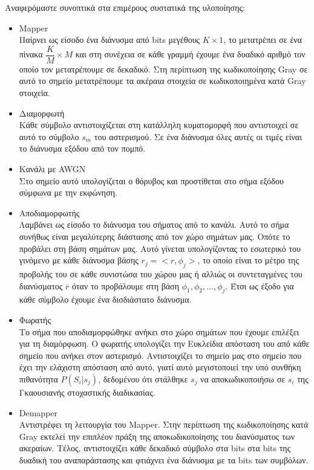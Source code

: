 \documentclass{article}
\begin{document}
Αναφερόμαστε συνοπτικά στα επιμέρους συστατικά της υλοποίησης:
    \begin{itemize}
        \item Mapper \\
        Παίρνει ως είσοδο ένα διάνυσμα από bits μεγέθους $K\times1$, το μετατρέπει σε ένα πίνακα $\dfrac{K}{M}\times M$ και στη συνέχεια σε κάθε γραμμή έχουμε ένα δυαδικό αριθμό τον οποίο τον μετατρέπουμε σε δεκαδικό. Στη περίπτωση της κωδικοποίησης Gray σε αυτό το σημείο μετατρέπουμε τα ακέραια στοιχεία σε κωδικοποιημένα κατά Gray στοιχεία. 
        \item Διαμορφωτή \\
        Κάθε σύμβολο αντιστοιχίζεται στη κατάλληλη κυματομορφή που αντιστοιχεί σε αυτό το σύμβολο $s_m$ του αστερισμού. Σε ένα διάνυσμα όλες αυτές οι τιμές είναι το διάνυσμα εξόδου από τον πομπό.
        \item Κανάλι με AWGN \\
        Στο σημείο αυτό υπολογίζεται ο θόρυβος και προστίθεται στο σήμα εξόδου σύμφωνα με την εκφώνηση.
        \item Αποδιαμορφωτής \\
        Λαμβάνει ως είσοδο το διάνυσμα του σήματος από το κανάλι. Αυτό το σήμα συνήθως είναι μεγαλύτερης διάστασης από τον χώρο σημάτων μας. Οπότε το προβάλει στη βάση σημάτων μας. Αυτό γίνεται υπολογίζοντας το εσωτερικό του γινόμενο με κάθε διάνυσμα βάσης $r_j = <r,\phi_j>$, το οποίο είναι το μέτρο της προβολής του σε κάθε συνιστώσα του χώρου μας ή αλλιώς οι συντεταγμένες του διανύσματος $\overline{r}$ όταν το προβάλουμε στη βάση ${\phi_1, \phi_2, \dots, \phi_j}$. Έτσι ως έξοδο για κάθε σύμβολο έχουμε ένα δισδιάστατο διάνυσμα.
        \item Φωρατής \\
        Το σήμα που αποδιαμορφώθηκε ανήκει στο χώρο σημάτων που έχουμε επιλέξει για τη διαμόρφωση. Ο φωρατής υπολογίζει την Ευκλείδια απόσταση του από κάθε σημείο που ανήκει στον αστερισμό. Αντιστοιχίζει το σημείο μας στο σημείο που έχει την ελάχιστη απόσταση από αυτό, γιατί αυτό μεγιστοποιεί την υπό συνθήκη πιθανότητα $P(S_i|s_j)$, δεδομένου ότι στάλθηκε $s_j$ να αποκωδικοποιήσω σε $s_i$ της Γκαουσιανής στοχαστικής διαδικασίας.
        \item Demapper \\
        Αντιστρέφει τη λειτουργία του Mapper. Στην περίπτωση της κωδικοποίησης κατά Gray εκτελεί την επιπλέον πράξη της αποκωδικοποίησης του διανύσματος των ακεραίων. Τέλος, αντιστοιχίζει κάθε δεκαδικό σύμβολο στα bits στα bits της δυαδική του αναπαράστασης και φτιάχνει ένα διάνυσμα με τα bits των συμβόλων.
    \end{itemize}
\end{document}

